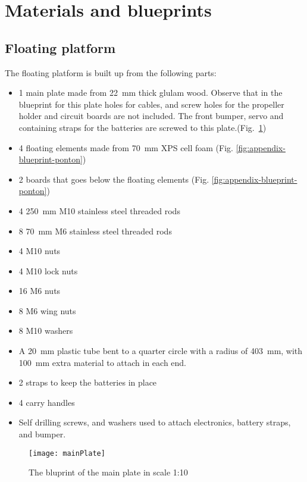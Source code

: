 \section{Materials and blueprints}\label{sec:appendix-a}

\subsection{Floating platform}

The floating platform is built up from the following parts:

\begin{itemize}
  \item 1 main plate made  from 22~mm thick glulam wood. Observe that in the
    blueprint for this plate holes for cables, and screw holes for the
    propeller holder and circuit boards are not included. The front bumper,
    servo and containing straps for the batteries are screwed to this plate.(Fig.~\ref{fig:appendix-blueprint-main-plate})
  \item 4 floating elements made from 70~mm XPS cell foam (Fig. \ref{fig:appendix-blueprint-ponton})
  \item 2 boards that goes below the floating elements (Fig. \ref{fig:appendix-blueprint-ponton})
  \item 4 250~mm M10 stainless steel threaded rods
  \item 8 70~mm M6 stainless steel threaded rods
  \item 4 M10 nuts
  \item 4 M10 lock nuts
  \item 16 M6 nuts
  \item 8 M6 wing nuts
  \item 8 M10 washers
  \item A 20~mm plastic tube bent to a quarter circle with a radius of 403~mm,
    with 100~mm extra material to attach in each end.
  \item 2 straps to keep the batteries in place
  \item 4 carry handles
  \item Self drilling screws, and washers used to attach electronics, battery
    straps, and bumper.
  \end{itemize}

  \begin{figure}
    \centering
    \texttt{[image: mainPlate]}

    \caption{The bluprint of the main plate in scale 1:10}
    \label{fig:appendix-blueprint-main-plate}
\end{figure}


